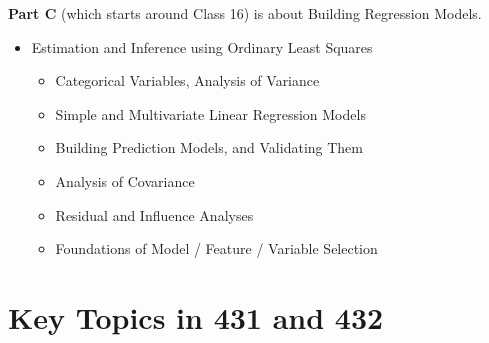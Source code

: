 \documentclass[
]{book}
\providecommand{\tightlist}{%
  \setlength{\itemsep}{0pt}\setlength{\parskip}{0pt}}
\begin{document}
\textbf{Part C} (which starts around Class 16) is about Building Regression Models.

\begin{itemize}
\tightlist
\item
  Estimation and Inference using Ordinary Least Squares

  \begin{itemize}
  \tightlist
  \item
    Categorical Variables, Analysis of Variance
  \item
    Simple and Multivariate Linear Regression Models
  \item
    Building Prediction Models, and Validating Them
  \item
    Analysis of Covariance
  \item
    Residual and Influence Analyses
  \item
    Foundations of Model / Feature / Variable Selection
  \end{itemize}
\end{itemize}

\hypertarget{key-topics-in-431-and-432-1}{%
\section{Key Topics in 431 and 432}\label{key-topics-in-431-and-432-1}}
\end{document}
